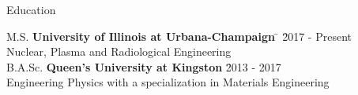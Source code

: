 \documentclass{resume2} %
\begin{document}

\begin{rSection}{Education}
	
\begin{tabbing}
M.S. \hspace*{2 em}\= \textbf{University of Illinois at Urbana-Champaign} \hspace*{5em} \= \hspace*{6em} \= 2017 - Present \\
\> Nuclear, Plasma and Radiological Engineering \\
%
B.A.Sc. \hspace*{2 em}\> \textbf{Queen's University at Kingston} \> \hspace*{7.2em} \= 2013 - 2017 \\
\> Engineering Physics with a specialization in Materials Engineering
\end{tabbing}

\end{rSection}

\end{document}
